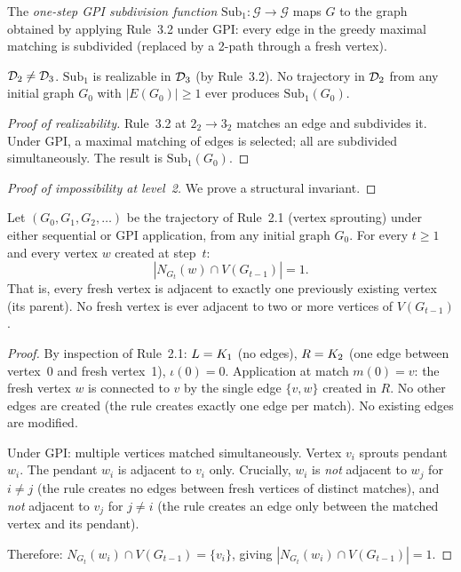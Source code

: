 \documentclass{../shared/primo}
\begin{document}
\begin{definition}
The \emph{one-step GPI subdivision function} $\mathrm{Sub}_1: \mathcal{G} \to \mathcal{G}$ maps $G$ to the graph obtained by applying Rule~3.2 under GPI: every edge in the greedy maximal matching is subdivided (replaced by a 2-path through a fresh vertex).
\end{definition}

\begin{theorem}\label{thm:sep23}
$\mathcal{D}_{2} \neq \mathcal{D}_{3}$. $\mathrm{Sub}_1$ is realizable in $\mathcal{D}_{3}$ (by Rule~3.2). No trajectory in $\mathcal{D}_{2}$ from any initial graph $G_0$ with $|E(G_0)| \geq 1$ ever produces $\mathrm{Sub}_1(G_0)$.
\end{theorem}

\begin{proof}[Proof of realizability]
Rule~3.2 at $2_2 \to 3_2$ matches an edge and subdivides it. Under GPI, a maximal matching of edges is selected; all are subdivided simultaneously. The result is $\mathrm{Sub}_1(G_0)$.
\end{proof}

\begin{proof}[Proof of impossibility at level~2]
We prove a structural invariant.
\end{proof}

\begin{lemma}\label{lem:betweenness}
Let $(G_0, G_1, G_2, \ldots)$ be the trajectory of Rule~2.1 (vertex sprouting) under either sequential or GPI application, from any initial graph $G_0$. For every $t \geq 1$ and every vertex $w$ created at step~$t$:
\[
|N_{G_t}(w) \cap V(G_{t-1})| = 1.
\]
That is, every fresh vertex is adjacent to exactly one previously existing vertex (its parent). No fresh vertex is ever adjacent to two or more vertices of $V(G_{t-1})$.
\end{lemma}

\begin{proof}
By inspection of Rule~2.1: $L = K_{1}$ (no edges), $R = K_{2}$ (one edge between vertex~0 and fresh vertex~1), $\iota(0) = 0$. Application at match $m(0) = v$: the fresh vertex $w$ is connected to $v$ by the single edge $\{v, w\}$ created in $R$. No other edges are created (the rule creates exactly one edge per match). No existing edges are modified.

Under GPI: multiple vertices matched simultaneously. Vertex $v_i$ sprouts pendant $w_i$. The pendant $w_i$ is adjacent to $v_i$ only. Crucially, $w_i$ is \emph{not} adjacent to $w_j$ for $i \neq j$ (the rule creates no edges between fresh vertices of distinct matches), and \emph{not} adjacent to $v_j$ for $j \neq i$ (the rule creates an edge only between the matched vertex and its pendant).

Therefore: $N_{G_t}(w_i) \cap V(G_{t-1}) = \{v_i\}$, giving $|N_{G_t}(w_i) \cap V(G_{t-1})| = 1$.
\end{proof}
\end{document}

